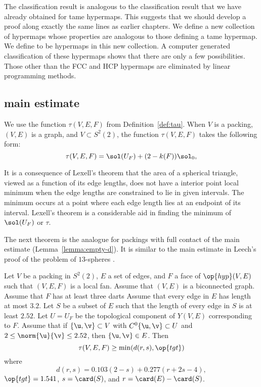 The classification result is analogous to the classification result
that we have already obtained for tame hypermaps.  This suggests that
we should develop a proof along exactly the same lines as earlier
chapters.  We  define a new collection of hypermaps whose
properties are analogous to those defining a tame hypermap.  We 
define  to be hypermaps in this
new collection.  A computer generated classification of these
hypermaps  shows that there are only a few possibilities.  Those
other than the FCC and HCP hypermaps  are eliminated by linear
programming methods.

\subsection{main estimate}




We use the function $\tau(V,E,F)$ from Definition~\ref{def:tau}.  When
$V$ is a packing, $(V,E)$ is a  graph, and
$V\subset S^2(2)$, the function $\tau(V,E,F)$ takes the following
form:
\[
\tau(V,E,F) = \sol(U_F) + (2-k(F)) \sol_0,
\]

\begin{remark}
  It is a consequence of Lexell's theorem that the area of a spherical
  triangle, viewed as a function of its edge lengths, does not have a
  interior point local minimum when the edge lengths are
  constrained to lie in given intervals.  The minimum occurs at a
  point where each edge length lies at an endpoint of its interval.
  Lexell's theorem is a considerable aid in finding the minimum of
  $\sol(U_F)$ or $\tau$.
\end{remark}

The next theorem is the analogue for packings with full contact of the
main estimate (Lemma~\ref{lemma:empty-d}).  It is similar to the main
estimate in Leech's proof of the problem of $13$-spheres
\cite{Leech:1956:MG}.


\begin{theorem}\label{lemma:main-estimate-12}
  Let $V$ be a packing in $S^2(2)$, $E$ a set of edges, and $F$ a face
  of $\op{hyp}(V,E)$ such that $(V,E,F)$ is a local fan.  Assume that
  $(V,E)$ is a biconnected graph.  Assume that $F$ has at least three
  darts Assume that every edge in $E$ has length at most $3.2$.  Let
  $S$ be a subset of $E$ such that the length of every edge in $S$ is
  at least $2.52$.  Let $U=U_F$ be the topological component of
  $Y(V,E)$ corresponding to $F$.  Assume that if $\{\u,\v\}\subset V$
  with $C^0\{\u,\v\}\subset U$ and $2\le\norm{\u}{\v} \le 2.52$, then
  $\{\u,\v\}\in E$.  Then
\[\tau(V,E,F) \ge \min(d(r,s),\op{tgt})\]
where
\[
d(r,s) = 0.103 (2-s) + 0.277 (r+2s-4),
\]
$\op{tgt}=1.541$, 
$s = \card(S)$, and $r = \card(E)-\card(S)$.
\end{theorem}

